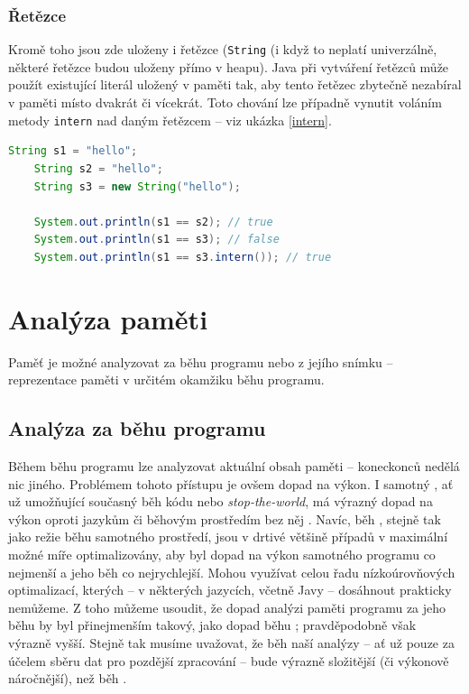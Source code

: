 \subsection{Řetězce}
Kromě toho jsou zde uloženy i řetězce (\texttt{String} (i když to neplatí univerzálně, některé řetězce budou uloženy přímo v heapu). Java při vytváření řetězců může použít existující literál uložený v paměti tak, aby tento řetězec zbytečně nezabíral v paměti místo dvakrát či vícekrát. Toto chování lze případně vynutit voláním metody \texttt{intern} nad daným řetězcem -- viz ukázka \ref{intern}. 

\begin{lstlisting}[caption={Příklad uchovávání řetězců a metody \texttt{intern}}, label={intern}, frame={single}, language={java}]
    String s1 = "hello";
    String s2 = "hello";
    String s3 = new String("hello");

    System.out.println(s1 == s2); // true
    System.out.println(s1 == s3); // false
    System.out.println(s1 == s3.intern()); // true
\end{lstlisting}




\chapter{Analýza paměti}

Paměť je možné analyzovat za běhu programu nebo z jejího snímku -- reprezentace paměti v určitém okamžiku běhu programu.

\section{Analýza za běhu programu}
Během běhu programu lze analyzovat aktuální obsah paměti --  koneckonců nedělá nic jiného. Problémem tohoto přístupu je ovšem dopad na výkon. I samotný , ať už umožňující současný běh kódu nebo \textit{stop-the-world}, má výrazný dopad na výkon oproti jazykům či běhovým prostředím bez něj \cite{gc}. Navíc, běh , stejně tak jako režie běhu samotného prostředí, jsou v drtivé většině případů v maximální možné míře optimalizovány, aby byl dopad na výkon samotného programu co nejmenší a jeho běh co nejrychlejší. Mohou využívat celou řadu nízkoúrovňových optimalizací, kterých -- v některých jazycích, včetně Javy -- dosáhnout prakticky nemůžeme. Z toho můžeme usoudit, že dopad analýzi paměti programu za jeho běhu by byl přinejmenším takový, jako dopad běhu ; pravděpodobně však výrazně vyšší. Stejně tak musíme uvažovat, že běh naší analýzy -- ať už pouze za účelem sběru dat pro pozdější zpracování -- bude výrazně složitější (či výkonově náročnější), než běh .

